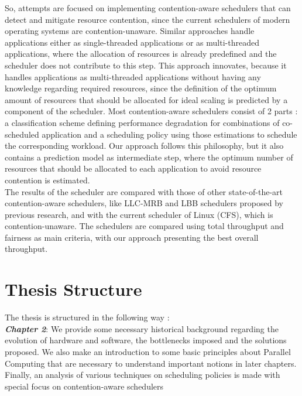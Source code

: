 \documentclass[diploma]{Styles/softlab-thesis}
\begin{document}
So, attempts are focused on implementing contention-aware schedulers that can detect and mitigate resource contention, since the current schedulers of modern operating systems are contention-unaware. Similar approaches handle applications either as single-threaded applications or as multi-threaded applications, where the allocation of resources is already predefined and the scheduler does not contribute to this step. This approach innovates, because it handles applications as multi-threaded applications without having any knowledge regarding required resources, since the definition of the optimum amount of resources that should be allocated for ideal scaling is predicted by a component of the scheduler. Most contention-aware schedulers consist of 2 parts : a classification scheme defining performance degradation for combinations of co-scheduled application and a scheduling policy using those estimations to schedule the corresponding workload. Our approach follows this philosophy, but it also contains a prediction model as intermediate step, where the optimum number of resources that should be allocated to each application to avoid resource contention is estimated. \\

The results of the scheduler are compared with those of other state-of-the-art contention-aware schedulers, like LLC-MRB \cite{reference13,reference2} and LBB schedulers \cite{reference13,reference14} proposed by previous research, and with the current scheduler of Linux (CFS), which is contention-unaware. The schedulers are compared using total throughput and fairness as main criteria, with our approach presenting the best overall throughput. \\


\section{Thesis Structure}

The thesis is structured in the following way : \\

\textbf{\emph{Chapter 2}}: We provide some necessary historical background regarding the evolution of hardware and software, the bottlenecks imposed and the solutions proposed. We also make an introduction to some basic principles about Parallel Computing that are necessary to understand important notions in later chapters. Finally, an analysis of various techniques on scheduling policies is made with special focus on contention-aware schedulers \\
\end{document}
